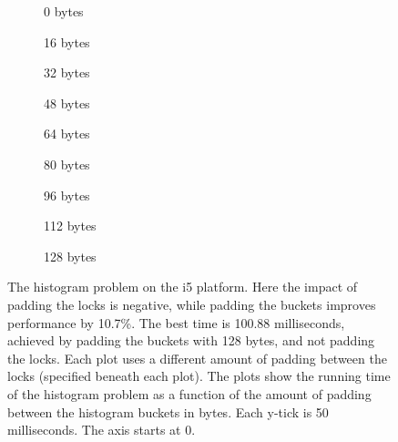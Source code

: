 \begin{figure}[hbpt]
	\graphicspath{{plots/}}
	\begin{subfigure}{0.32\textwidth}
		
		\caption{0 bytes}
	\end{subfigure}
	\begin{subfigure}{0.32\textwidth}
		
		\caption{16 bytes}
	\end{subfigure}
	\begin{subfigure}{0.32\textwidth}
		
		\caption{32 bytes}
	\end{subfigure}
	\begin{subfigure}{0.32\textwidth}
		
		\caption{48 bytes}
	\end{subfigure}
	\begin{subfigure}{0.32\textwidth}
		
		\caption{64 bytes}
	\end{subfigure}
	\begin{subfigure}{0.32\textwidth}
		
		\caption{80 bytes}
	\end{subfigure}
	\begin{subfigure}{0.32\textwidth}
		
		\caption{96 bytes}
	\end{subfigure}
	\begin{subfigure}{0.32\textwidth}
		
		\caption{112 bytes}
	\end{subfigure}
	\begin{subfigure}{0.32\textwidth}
		
		\caption{128 bytes}
	\end{subfigure}
	\caption{The histogram problem on the i5 platform. Here the impact of
	padding the locks is negative, while padding the buckets improves
	performance by 10.7\%. The best time is 100.88 milliseconds, achieved by
	padding the buckets with 128 bytes, and not padding the locks.
	Each plot uses a different amount of padding between the locks
	(specified beneath each plot). The plots show the running time of the
	histogram problem as a function of the amount of padding between the
	histogram buckets in bytes. Each y-tick is 50 milliseconds. The axis
	starts at 0.}
	\label{fig:histo-local-i5}
\end{figure}

